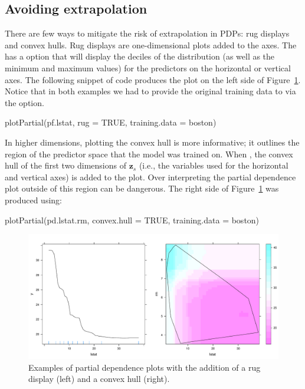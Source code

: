 \subsection{Avoiding extrapolation}

There are few ways to mitigate the risk of extrapolation in PDPs: rug displays and convex hulls. Rug displays are one-dimensional plots added to the axes. The  has a  option that will display the deciles of the distribution  (as well as the minimum and maximum values) for the predictors on the horizontal or vertical axes. The following snippet of code produces the plot on the left side of Figure~\ref{fig:partial_extrap}. Notice that in both examples we had to provide the original training data to  via the  option.
\begin{example}
plotPartial(pf.lstat, rug = TRUE, training.data = boston)
\end{example}

In higher dimensions, plotting the convex hull is more informative; it outlines the region of the predictor space that the model was trained on. When , the convex hull of the first two dimensions of $\boldsymbol{z}_s$ (i.e., the variables used for the horizontal and vertical axes) is added to the plot. Over interpreting the partial dependence plot outside of this region can be dangerous. The right side of Figure~\ref{fig:partial_extrap} was produced using:
\begin{example}
plotPartial(pd.lstat.rm, convex.hull = TRUE, training.data = boston)
\end{example}

\begin{figure}[htbp]
  \centering
  \includegraphics[width=0.8\linewidth]{partial_extrap}
  \caption{Examples of partial dependence plots with the addition of a rug display (left) and a convex hull (right).}
  \label{fig:partial_extrap}
\end{figure}

